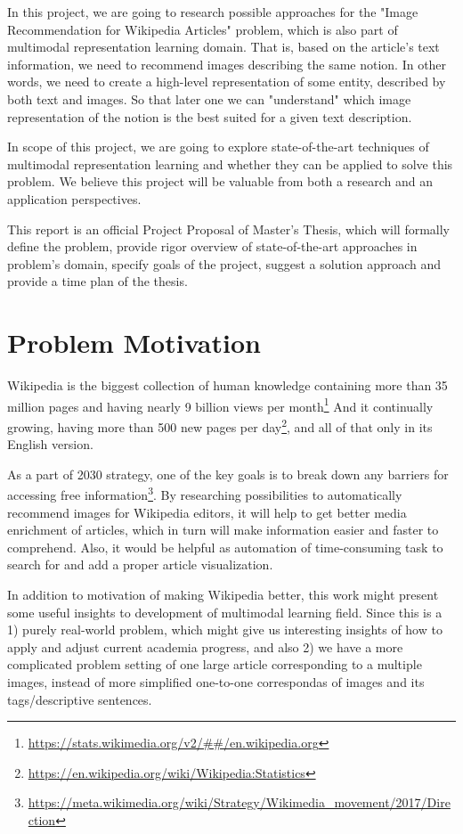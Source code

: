 In this project, we are going to research possible approaches for the "Image Recommendation for Wikipedia Articles" problem, which is also part of multimodal representation learning domain. That is, based on the article's text information, we need to recommend images describing the same notion. In other words, we need to create a high-level representation of some entity, described by both text and images. So that later one we can "understand" which image representation of the notion is the best suited for a given text description.

In scope of this project, we are going to explore state-of-the-art techniques of multimodal representation learning and whether they can be applied to solve this problem. We believe this project will be valuable from both a research and an application perspectives.

This report is an official Project Proposal of Master's Thesis, which will formally define the problem, provide rigor overview of state-of-the-art approaches in problem's domain, specify goals of the project, suggest a solution approach and provide a time plan of the thesis.

\section{Problem Motivation}
Wikipedia is the biggest collection of human knowledge containing more than 35 million pages and having nearly 9 billion views per month\footnote{\url{https://stats.wikimedia.org/v2/##/en.wikipedia.org}} And it continually growing, having more than 500 new pages per day\footnote{\url{https://en.wikipedia.org/wiki/Wikipedia:Statistics}}, and all of that only in its English version.

As a part of 2030 strategy, one of the key goals is to break down any barriers for accessing free information\footnote{\url{https://meta.wikimedia.org/wiki/Strategy/Wikimedia_movement/2017/Direction}}. By researching possibilities to automatically recommend images for Wikipedia editors, it will help to get better media enrichment of articles, which in turn will make information easier and faster to comprehend\cite{ref_image_attention}. Also, it would be helpful as automation of time-consuming task to search for and add a proper article visualization. 

In addition to motivation of making Wikipedia better, this work might present some useful insights to development of multimodal learning field. Since this is a 1) purely real-world problem, which might give us interesting insights of how to apply and adjust current academia progress, and also 2) we have a more complicated problem setting of one large article corresponding to a multiple images, instead of more simplified one-to-one correspondas of images and its tags/descriptive sentences.


